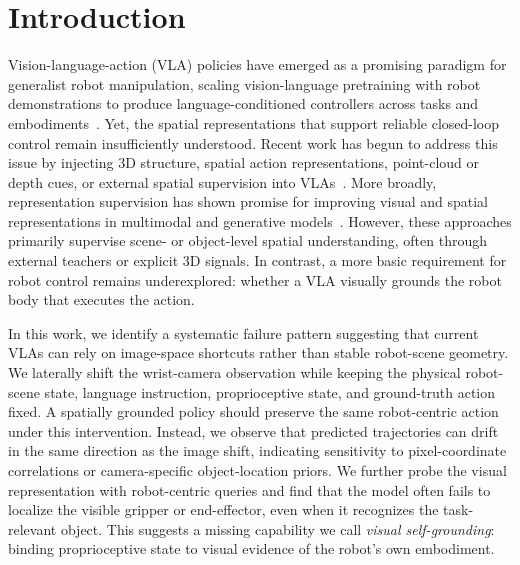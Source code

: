 \section{Introduction}

Vision-language-action (VLA) policies have emerged as a promising paradigm for
generalist robot manipulation, scaling vision-language pretraining with robot
demonstrations to produce language-conditioned controllers across tasks and
embodiments~\citep{brohan2023rt1roboticstransformerrealworld,brohan2023rt2visionlanguageactionmodelstransfer,octomodelteam2024octoopensourcegeneralistrobot,kim2024openvlaopensourcevisionlanguageactionmodel,black2026pi0visionlanguageactionflowmodel,embodimentcollaboration2025openxembodimentroboticlearning}. Yet, the spatial
representations that support reliable closed-loop control remain insufficiently
understood. Recent work has begun to address this issue by injecting 3D
structure, spatial action representations, point-cloud or depth cues, or
external spatial supervision into VLAs~\citep{zhen20243dvla3dvisionlanguageactiongenerative,qu2025spatialvlaexploringspatialrepresentations,li2025pointvlainjecting3dworld,li2025bridgevlainputoutputalignmentefficient,sun2025geovlaempowering3drepresentations,li2025spatialforcingimplicitspatial}. More broadly, representation supervision has shown
promise for improving visual and spatial representations in multimodal and
generative models~\citep{wang2024reconstructivevisualinstructiontuning,yu2025representationalignmentgenerationtraining,huang20253drsmllmsneed3daware}. However,
these approaches primarily supervise scene- or object-level spatial
understanding, often through external teachers or explicit 3D signals. In
contrast, a more basic requirement for robot control remains underexplored:
whether a VLA visually grounds the robot body that executes the action.

In this work, we identify a systematic failure pattern suggesting that current
VLAs can rely on image-space shortcuts rather than stable robot-scene geometry.
We laterally shift the wrist-camera observation while keeping the physical
robot-scene state, language instruction, proprioceptive state, and ground-truth
action fixed. A spatially grounded policy should preserve the same
robot-centric action under this intervention. Instead, we observe that predicted
trajectories can drift in the same direction as the image shift, indicating
sensitivity to pixel-coordinate correlations or camera-specific object-location
priors. We further probe the visual representation with robot-centric queries
and find that the model often fails to localize the visible gripper or
end-effector, even when it recognizes the task-relevant object. This suggests a
missing capability we call \emph{visual self-grounding}: binding proprioceptive
state to visual evidence of the robot's own embodiment.

